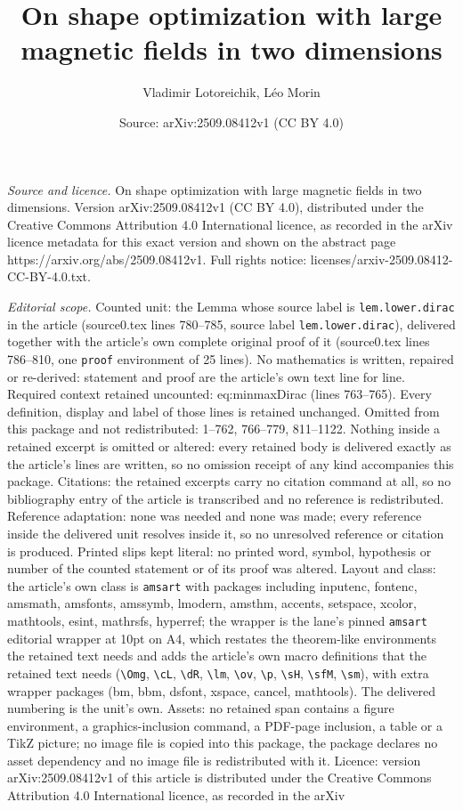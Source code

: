 \documentclass[10pt,a4paper]{amsart}
\title[On shape optimization with large magnetic fields in two dime]{On shape optimization with large magnetic fields in two dimensions}
\author{Vladimir Lotoreichik, L\'eo Morin}
\date{Source: arXiv:2509.08412v1 (CC BY 4.0)}
\begin{document}
\maketitle

\noindent\emph{Source and licence.} On shape optimization with large magnetic fields in two dimensions. Version arXiv:2509.08412v1 (CC BY 4.0), distributed under the Creative Commons Attribution 4.0 International licence, as recorded in the arXiv licence metadata for this exact version and shown on the abstract page https://arxiv.org/abs/2509.08412v1. Full rights notice: licenses/arxiv-2509.08412-CC-BY-4.0.txt.\par\smallskip

\noindent\textit{Editorial scope.} Counted unit: the Lemma whose source label is \texttt{lem.lower.dirac} in the article (source0.tex lines 780--785, source label \texttt{lem.lower.dirac}), delivered together with the article's own complete original proof of it (source0.tex lines 786--810, one \texttt{proof} environment of 25 lines). No mathematics is written, repaired or re-derived: statement and proof are the article's own text line for line. Required context retained uncounted: eq:minmaxDirac (lines 763--765). Every definition, display and label of those lines is retained unchanged. Omitted from this package and not redistributed: 1--762, 766--779, 811--1122. Nothing inside a retained excerpt is omitted or altered: every retained body is delivered exactly as the article's lines are written, so no omission receipt of any kind accompanies this package. Citations: the retained excerpts carry no citation command at all, so no bibliography entry of the article is transcribed and no reference is redistributed. Reference adaptation: none was needed and none was made; every reference inside the delivered unit resolves inside it, so no unresolved reference or citation is produced. Printed slips kept literal: no printed word, symbol, hypothesis or number of the counted statement or of its proof was altered. Layout and class: the article's own class is \texttt{amsart} with packages including inputenc, fontenc, amsmath, amsfonts, amssymb, lmodern, amsthm, accents, setspace, xcolor, mathtools, esint, mathrsfs, hyperref; the wrapper is the lane's pinned \texttt{amsart} editorial wrapper at 10pt on A4, which restates the theorem-like environments the retained text needs and adds the article's own macro definitions that the retained text needs (\texttt{\textbackslash Omg}, \texttt{\textbackslash cL}, \texttt{\textbackslash dR}, \texttt{\textbackslash lm}, \texttt{\textbackslash ov}, \texttt{\textbackslash p}, \texttt{\textbackslash sH}, \texttt{\textbackslash sfM}, \texttt{\textbackslash sm}), with extra wrapper packages (bm, bbm, dsfont, xspace, cancel, mathtools). The delivered numbering is the unit's own. Assets: no retained span contains a figure environment, a graphics-inclusion command, a PDF-page inclusion, a table or a TikZ picture; no image file is copied into this package, the package declares no asset dependency and no image file is redistributed with it. Licence: version arXiv:2509.08412v1 of this article is distributed under the Creative Commons Attribution 4.0 International licence, as recorded in the arXiv 
\end{document}
